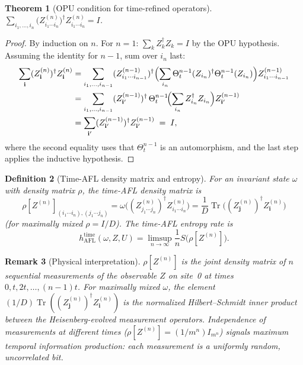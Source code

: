 \documentclass[12pt,a4paper]{article}
\newtheorem{theorem}{Theorem}[section]
\newtheorem{definition}[theorem]{Definition}
\newtheorem{remark}[theorem]{Remark}
\begin{document}
\begin{theorem}[OPU condition for time-refined operators]
\label{thm:time_opu}
$\displaystyle\sum_{i_1,\ldots,i_n} \bigl(Z^{(n)}_{i_1\cdots i_n}\bigr)^{\dagger}
Z^{(n)}_{i_1\cdots i_n}=I$.
\end{theorem}
\begin{proof}
By induction on $n$.  For $n=1$: $\sum_k Z_k^{\dagger}Z_k=I$ by the OPU
hypothesis.  Assuming the identity for $n-1$, sum over $i_n$ last:
\begin{align*}
\sum_{\mathbf{i}} (Z^{(n)}_{\mathbf{i}})^{\dagger}Z^{(n)}_{\mathbf{i}}
&= \sum_{i_1,\ldots,i_{n-1}}
   (Z^{(n-1)}_{i_1\cdots i_{n-1}})^{\dagger}
   \Bigl(\sum_{i_n}\Theta_t^{n-1}(Z_{i_n})^{\dagger}\Theta_t^{n-1}(Z_{i_n})\Bigr)
   Z^{(n-1)}_{i_1\cdots i_{n-1}}\\
&= \sum_{i_1,\ldots,i_{n-1}}
   (Z^{(n-1)}_{\mathbf{i}'})^{\dagger}
   \,\Theta_t^{n-1}\!\Bigl(\sum_{i_n}Z_{i_n}^{\dagger}Z_{i_n}\Bigr)
   Z^{(n-1)}_{\mathbf{i}'}\\
&= \sum_{\mathbf{i}'}
   (Z^{(n-1)}_{\mathbf{i}'})^{\dagger}Z^{(n-1)}_{\mathbf{i}'}
  \;=\; I,
\end{align*}
where the second equality uses that $\Theta_t^{n-1}$ is an automorphism, and
the last step applies the inductive hypothesis.
\end{proof}

\begin{definition}[Time-AFL density matrix and entropy]
For an invariant state $\omega$ with density matrix $\rho$, the
\emph{time-AFL density matrix} is
\[
  \rho[Z^{(n)}]_{(i_1\cdots i_n),(j_1\cdots j_n)}
  = \omega\bigl((Z^{(n)}_{j_1\cdots j_n})^{\dagger}Z^{(n)}_{i_1\cdots i_n}\bigr)
  = \frac{1}{D}\operatorname{Tr}\!\bigl(
    (Z^{(n)}_\mathbf{j})^{\dagger}Z^{(n)}_\mathbf{i}\bigr)
\]
(for maximally mixed $\rho=I/D$).  The \emph{time-AFL entropy rate} is
\[
  h_{\mathrm{AFL}}^{\mathrm{time}}(\omega,Z,U)
  = \limsup_{n\to\infty}\frac{1}{n}S\!\bigl(\rho[Z^{(n)}]\bigr).
\]
\end{definition}

\begin{remark}[Physical interpretation]
$\rho[Z^{(n)}]$ is the joint density matrix of $n$ sequential measurements of
the observable $Z$ on site~0 at times $0,t,2t,\ldots,(n-1)t$.  For maximally
mixed $\omega$, the element
$(1/D)\operatorname{Tr}((Z^{(n)}_\mathbf{j})^{\dagger}Z^{(n)}_\mathbf{i})$
is the normalized Hilbert--Schmidt inner product between the Heisenberg-evolved
measurement operators.  Independence of measurements at different times
($\rho[Z^{(n)}]=(1/m^n)I_{m^n}$) signals maximum temporal information
production: each measurement is a uniformly random, uncorrelated bit.
\end{remark}
\end{document}
